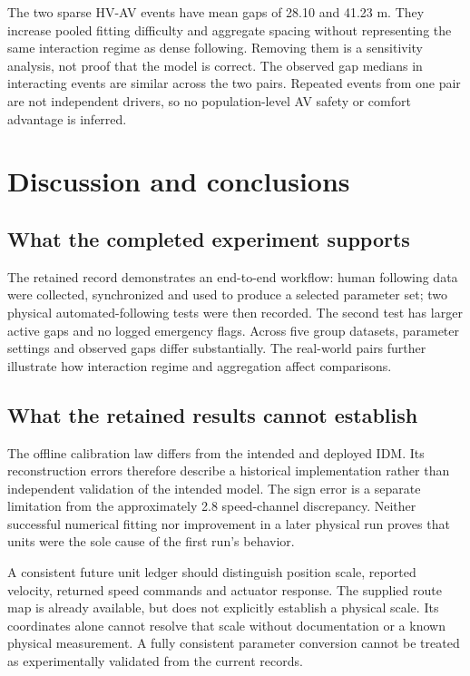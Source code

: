 \documentclass[11pt,a4paper]{article}
\begin{document}
The two sparse HV-AV events have mean gaps of 28.10 and 41.23 m. They increase pooled fitting difficulty and aggregate spacing without representing the same interaction regime as dense following. Removing them is a sensitivity analysis, not proof that the model is correct. The observed gap medians in interacting events are similar across the two pairs. Repeated events from one pair are not independent drivers, so no population-level AV safety or comfort advantage is inferred.


\newpage

\section{Discussion and conclusions}

\subsection*{What the completed experiment supports}

The retained record demonstrates an end-to-end workflow: human following data were collected, synchronized and used to produce a selected parameter set; two physical automated-following tests were then recorded. The second test has larger active gaps and no logged emergency flags. Across five group datasets, parameter settings and observed gaps differ substantially. The real-world pairs further illustrate how interaction regime and aggregation affect comparisons.


\subsection*{What the retained results cannot establish}

The offline calibration law differs from the intended and deployed IDM. Its reconstruction errors therefore describe a historical implementation rather than independent validation of the intended model. The sign error is a separate limitation from the approximately 2.8 speed-channel discrepancy. Neither successful numerical fitting nor improvement in a later physical run proves that units were the sole cause of the first run's behavior.


A consistent future unit ledger should distinguish position scale, reported velocity, returned speed commands and actuator response. The supplied route map is already available, but does not explicitly establish a physical scale. Its coordinates alone cannot resolve that scale without documentation or a known physical measurement. A fully consistent parameter conversion cannot be treated as experimentally validated from the current records.
\end{document}
